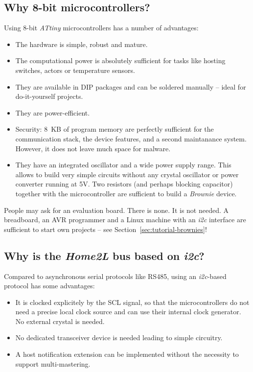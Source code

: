 \documentclass[12pt,english,parskip=half,headheight=19pt]{scrreprt}
\begin{document}
\subsection*{Why 8-bit microcontrollers?}

Using 8-bit \textit{ATtiny} microcontrollers has a number of advantages:
\begin{itemize}
  \item The hardware is simple, robust and mature.
  \item The computational power is absolutely sufficient for tasks like hosting switches,
        actors or temperature sensors.
  \item They are available in DIP packages and can be soldered manually -- ideal for do-it-yourself
        projects.
  \item They are power-efficient.
  \item Security: 8~KB of program memory are perfectly sufficient for the communication stack,
        the device features, and a second maintanance system. However, it does not leave much space
        for malware.
  \item They have an integrated oscillator and a wide power supply range. This allows to build
        very simple circuits without any crystal oscillator or power converter running at 5V.
        Two resistors (and perhaps blocking capacitor) together with the microcontroller are
        sufficient to build a \textit{Brownie} device.
\end{itemize}

People may ask for an evaluation board. There is none. It is not needed. A breadboard, an AVR programmer and a Linux machine with an \textit{i2c} interface are sufficient to start own projects -- see Section~\ref{sec:tutorial-brownies}!



\subsection*{Why is the \textit{Home2L} bus based on \textit{i2c}?}

Compared to asynchronous serial protocols like RS485, using an \textit{i2c}-based protocol has some advantages:
\begin{itemize}
  \item It is clocked explicitely by the SCL signal, so that the microcontrollers do not need a precise
        local clock source and can use their internal clock generator. No external crystal is needed.
  \item No dedicated transceiver device is needed leading to simple circuitry.
  \item A host notification extension can be implemented without the necessity to support
        multi-mastering.
\end{itemize}
\end{document}
